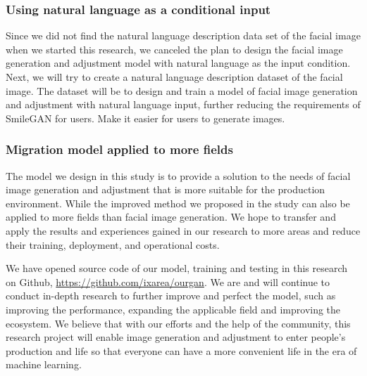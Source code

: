 \subsubsection*{Using natural language as a conditional input}
Since we did not find the natural language description data set of the facial image when we started this research, we canceled the plan to design the facial image generation and adjustment model with natural language as the input condition.
Next, we will try to create a natural language description dataset of the facial image.
The dataset will be to design and train a model of facial image generation and adjustment with natural language input, further reducing the requirements of SmileGAN for users.
Make it easier for users to generate images.
\subsubsection*{Migration model applied to more fields}
The model we design in this study is to provide a solution to the needs of facial image generation and adjustment that is more suitable for the production environment.
While the improved method we proposed in the study can also be applied to more fields than facial image generation.
We hope to transfer and apply the results and experiences gained in our research to more areas and reduce their training, deployment, and operational costs.

\vspace{4ex}

We have opened source code of our model, training and testing in this research on Github, \url{https://github.com/ixarea/ourgan}.
We are and will continue to conduct in-depth research to further improve and perfect the model,
    such as improving the performance, expanding the applicable field and improving the ecosystem.
We believe that with our efforts and the help of the community,
    this research project will enable image generation and adjustment to enter people's production and life
    so that everyone can have a more convenient life in the era of machine learning.






